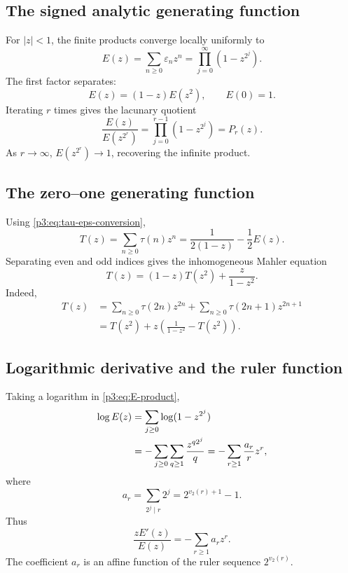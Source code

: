 \documentclass[11pt,oneside]{article}
\theoremstyle{definition}
\theoremstyle{remark}
\newcommand{\vtwo}{v_2}
\newcommand{\eps}{\varepsilon}
\begin{document}
\subsection{The signed analytic generating function}

For $|z|<1$, the finite products converge locally uniformly to
\begin{equation}\label{p3:eq:E-product}
 E(z)=\sum_{n\ge0}\eps_nz^n
     =\prod_{j=0}^{\infty}(1-z^{2^j}).
\end{equation}
The first factor separates:
\begin{equation}\label{p3:eq:E-mahler}
 \boxed{\qquad E(z)=(1-z)E(z^2),\qquad E(0)=1.\qquad}
\end{equation}
Iterating $r$ times gives the lacunary quotient
\begin{equation}\label{p3:eq:lacunary-quotient}
 \frac{E(z)}{E(z^{2^r})}=\prod_{j=0}^{r-1}(1-z^{2^j})=P_r(z).
\end{equation}
As $r\to\infty$, $E(z^{2^r})\to1$, recovering the infinite product.

\subsection{The zero--one generating function}

Using \cref{p3:eq:tau-eps-conversion},
\begin{equation}\label{p3:eq:T-from-E}
 \boxed{\qquad
 T(z)=\sum_{n\ge0}\tau(n)z^n
 =\frac1{2(1-z)}-\frac12E(z).
 \qquad}
\end{equation}
Separating even and odd indices gives the inhomogeneous Mahler equation
\begin{equation}\label{p3:eq:T-mahler}
 \boxed{\qquad
 T(z)=(1-z)T(z^2)+\frac{z}{1-z^2}.
 \qquad}
\end{equation}
Indeed,
\begin{align*}
 T(z)
 &=\sum_{n\ge0}\tau(2n)z^{2n}
   +\sum_{n\ge0}\tau(2n+1)z^{2n+1}\\
 &=T(z^2)+z\left(\frac1{1-z^2}-T(z^2)\right).
\end{align*}

\subsection{Logarithmic derivative and the ruler function}

Taking a logarithm in \cref{p3:eq:E-product},
\begin{align}
 \log E(z)
 &=\sum_{j\ge0}\log(1-z^{2^j})\notag\\
 &=-\sum_{j\ge0}\sum_{q\ge1}\frac{z^{q2^j}}q
 =-\sum_{r\ge1}\frac{a_r}{r}z^r,\label{p3:eq:log-E}
\end{align}
where
\begin{equation}\label{p3:eq:ruler-coeff}
 a_r=\sum_{2^j\mid r}2^j=2^{\vtwo(r)+1}-1.
\end{equation}
Thus
\begin{equation}\label{p3:eq:log-derivative-E}
 \frac{zE'(z)}{E(z)}=-\sum_{r\ge1}a_rz^r.
\end{equation}
The coefficient $a_r$ is an affine function of the ruler sequence
$2^{\vtwo(r)}$.
\end{document}
